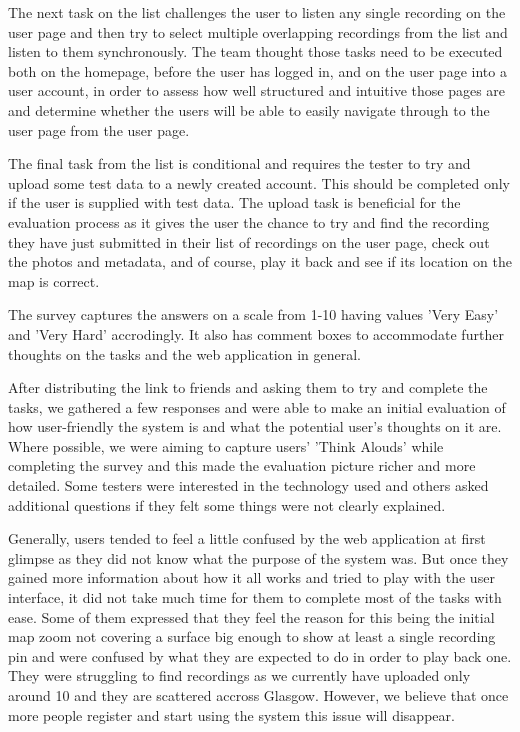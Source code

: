 \documentclass{l3proj}
\begin{document}
The next task on the list challenges the user to listen any single recording on the user page and then try to select multiple overlapping recordings from the list and listen to them synchronously.
The team thought those tasks need to be executed both on the homepage, before the user has logged in, and on the user page into a user account, in order to assess how well structured and intuitive those pages are and determine whether the users will be able to easily navigate through to the user page from the user page.

The final task from the list is conditional and requires the tester to try and upload some test data to a newly created account.
This should be completed only if the user is supplied with test data.
The upload task is beneficial for the evaluation process as it gives the user the chance to try and find the recording they have just submitted in their list of recordings on the user page, check out the photos and metadata, and of course, play it back and see if its location on the map is correct.

The survey captures the answers on a scale from 1-10 having values 'Very Easy' and 'Very Hard' accrodingly.
It also has comment boxes to accommodate further thoughts on the tasks and the web application in general.

After distributing the link to friends and asking them to try and complete the tasks, we gathered a few responses and were able to make an initial evaluation of how user-friendly the system is and what the potential user's thoughts on it are.
Where possible, we were aiming to capture users' 'Think Alouds' while completing the survey and this made the evaluation picture richer and more detailed.
Some testers were interested in the technology used and others asked additional questions if they felt some things were not clearly explained.

Generally, users tended to feel a little confused by the web application at first glimpse as they did not know what the purpose of the system was.
But once they gained more information about how it all works and tried to play with the user interface, it did not take much time for them to complete most of the tasks with ease.
Some of them expressed that they feel the reason for this being the initial map zoom not covering a surface big enough to show at least a single recording pin and were confused by what they are expected to do in order to play back one.
They were struggling to find recordings as we currently have uploaded only around 10 and they are scattered accross Glasgow.
However, we believe that once more people register and start using the system this issue will disappear.
\end{document}
